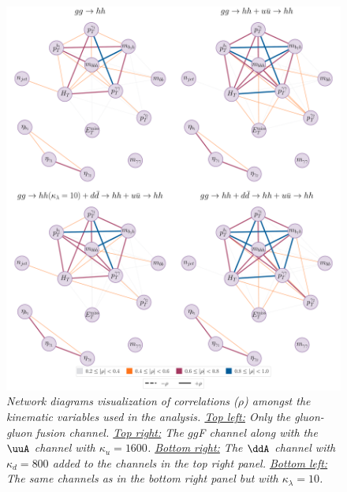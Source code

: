 \begin{figure}[h!]
	\centering
	\includegraphics[width=0.9\linewidth]{fig/networks-signal-progression.pdf}
	\caption{\it Network diagrams visualization of correlations ($\rho$) amongst the kinematic variables used in the analysis. \uline{Top left:} Only the gluon-gluon fusion channel. \uline{Top right:} The $gg$F channel along with the $\uuA$ channel with $\kappa_u=1600$. \uline{Bottom right:} The $\ddA$ channel with $\kappa_d=800$  added to the channels in the top right panel. \uline{Bottom left:} The same channels as in the bottom right panel but with $\kappa_\lambda=10$.}
	\label{fig:cor-net}
\end{figure}

